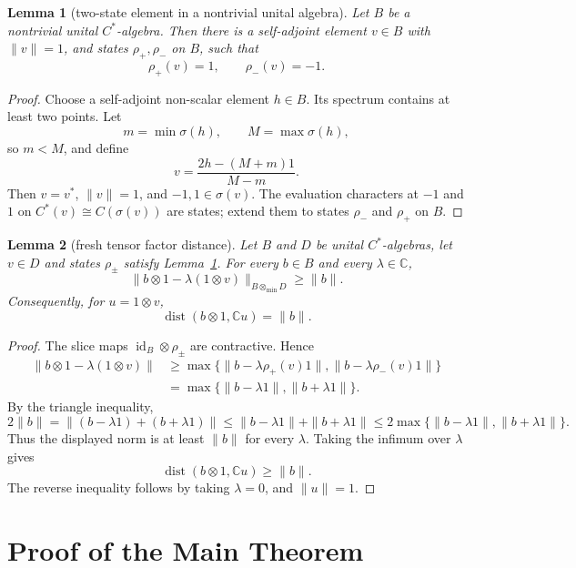 \documentclass[11pt]{article}
\newtheorem{lemma}{Lemma}
\newcommand{\C}{\mathbb C}
\newcommand{\dist}{\operatorname{dist}}
\newcommand{\otmin}{\otimes_{\min}}
\begin{document}
\begin{lemma}[two-state element in a nontrivial unital algebra]
\label{lem:two-state}
Let \(B\) be a nontrivial unital \(C^*\)-algebra.  Then there is a
self-adjoint element \(v\in B\) with \(\|v\|=1\), and states
\(\rho_+,\rho_-\) on \(B\), such that
\[
        \rho_+(v)=1,\qquad \rho_-(v)=-1.
\]
\end{lemma}

\begin{proof}
Choose a self-adjoint non-scalar element \(h\in B\).  Its spectrum contains
at least two points.  Let
\[
        m=\min\sigma(h),\qquad M=\max\sigma(h),
\]
so \(m<M\), and define
\[
        v=\frac{2h-(M+m)1}{M-m}.
\]
Then \(v=v^*\), \(\|v\|=1\), and \(-1,1\in\sigma(v)\).  The evaluation
characters at \(-1\) and \(1\) on \(C^*(v)\cong C(\sigma(v))\) are states;
extend them to states \(\rho_-\) and \(\rho_+\) on \(B\).
\end{proof}

\begin{lemma}[fresh tensor factor distance]
\label{lem:distance}
Let \(B\) and \(D\) be unital \(C^*\)-algebras, let \(v\in D\) and states
\(\rho_\pm\) satisfy Lemma~\ref{lem:two-state}.  For every \(b\in B\) and
every \(\lambda\in\C\),
\[
        \|b\otimes 1-\lambda(1\otimes v)\|_{B\otmin D}
        \ge
        \|b\|.
\]
Consequently, for \(u=1\otimes v\),
\[
        \dist(b\otimes1,\C u)=\|b\|.
\]
\end{lemma}

\begin{proof}
The slice maps \(\operatorname{id}_B\otimes\rho_\pm\) are contractive.  Hence
\[
\begin{aligned}
        \|b\otimes 1-\lambda(1\otimes v)\|
        &\ge
        \max\{\|b-\lambda\rho_+(v)1\|,
              \|b-\lambda\rho_-(v)1\|\}\\
        &=
        \max\{\|b-\lambda1\|,\|b+\lambda1\|\}.
\end{aligned}
\]
By the triangle inequality,
\[
        2\|b\|
        =
        \|(b-\lambda1)+(b+\lambda1)\|
        \le
        \|b-\lambda1\|+\|b+\lambda1\|
        \le
        2\max\{\|b-\lambda1\|,\|b+\lambda1\|\}.
\]
Thus the displayed norm is at least \(\|b\|\) for every \(\lambda\).  Taking
the infimum over \(\lambda\) gives
\[
        \dist(b\otimes1,\C u)\ge \|b\|.
\]
The reverse inequality follows by taking \(\lambda=0\), and \(\|u\|=1\).
\end{proof}

\section*{Proof of the Main Theorem}
\end{document}
